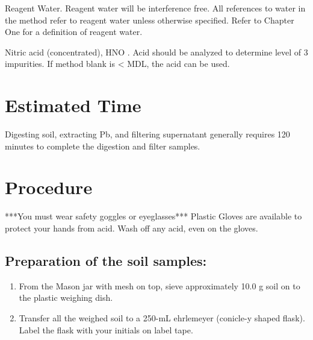 \documentclass[12pt]{../SOP3_alpha}\usepackage[]{graphicx}\usepackage[]{color}
\begin{document}
\NP Reagent Water. Reagent water will be interference free. All references to water in
the method refer to reagent water unless otherwise specified. Refer to Chapter One for a definition
of reagent water.

\NP Nitric acid (concentrated), HNO . Acid should be analyzed to determine level of 3
impurities. If method blank is < MDL, the acid can be used. 


\section{Estimated Time}

\NP Digesting soil, extracting Pb, and filtering supernatant  generally requires 120 minutes to complete the digestion and filter samples.


\section{Procedure}


***You must wear safety goggles or eyeglasses***
Plastic Gloves are available to protect your hands from acid. Wash off any acid, even on the gloves.

\subsection {Preparation of the soil samples:}
  \begin{enumerate}
    \item From the Mason jar with mesh on top, sieve approximately 10.0 g soil on to the plastic weighing dish.
    \item Transfer all the weighed soil to a 250-mL ehrlemeyer (conicle-y shaped flask). Label the flask with your initials on label tape. 
  \end{enumerate}
\end{document}
